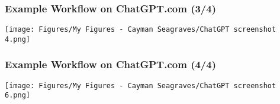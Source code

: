 \documentclass{beamer}
\begin{document}
\begin{frame}
    \frametitle{Example Workflow on ChatGPT.com (3/4)}
    \vfill
    \centering
    \texttt{[image: Figures/My Figures - Cayman Seagraves/ChatGPT screenshot 4.png]}
    \vfill
\end{frame}

\begin{frame}
    \frametitle{Example Workflow on ChatGPT.com (4/4)}
    \vfill
    \centering
    \texttt{[image: Figures/My Figures - Cayman Seagraves/ChatGPT screenshot 6.png]}
    \vfill
\end{frame}






\end{document}

